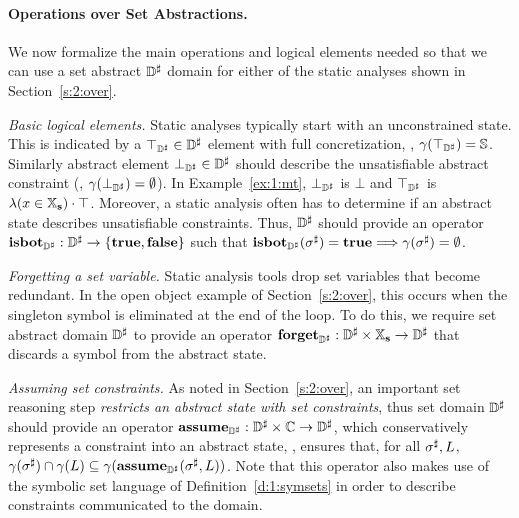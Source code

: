 \paragraph{Operations over Set Abstractions.}
We now formalize the main operations and logical elements needed so that
we can use a set abstract \( {\mathbb{D}}^{\sharp} \) domain for either of the static
analyses shown in Section~\ref{s:2:over}.
\begin{asparaitem}
\item \emph{Basic logical elements.}
  Static analyses typically start with an unconstrained state.
  This is indicated by a \( \top_{{\mathbb{D}}^{\sharp}} \in {\mathbb{D}}^{\sharp} \) element with full
  concretization, \ie, \( \gamma( \top_{{\mathbb{D}}^{\sharp}} ) = \mathbb{S} \).
  Similarly abstract element \( \bot_{{\mathbb{D}}^{\sharp}} \in {\mathbb{D}}^{\sharp} \) should describe
  the unsatisfiable abstract constraint (\ie, \( \gamma( \bot_{{\mathbb{D}}^{\sharp}} ) =
  \emptyset \)).
  In Example~\ref{ex:1:mt}, \( \bot_{{\mathbb{D}}^{\sharp}} \) is \( \bot \) and \( \top_{{\mathbb{D}}^{\sharp}} \)
  is \( \lambda (x \in \mathbb{X}_{\bf s}) \cdot \top \).
  Moreover, a static analysis often has to determine if an abstract state
  describes unsatisfiable constraints.
  Thus, \( {\mathbb{D}}^{\sharp} \) should provide an operator \( \textbf{isbot}_{{\mathbb{D}}^{\sharp}}: {\mathbb{D}}^{\sharp}
  \rightarrow \{ \mathbf{true}, \mathbf{false} \} \) such that \( \textbf{isbot}_{{\mathbb{D}}^{\sharp}}( {\sigma}^{\sharp} )
  = \mathbf{true} \Longrightarrow \gamma( {\sigma}^{\sharp} ) = \emptyset \).

\item \emph{Forgetting a set variable.}
  Static analysis tools drop set variables that become redundant.
  In the open object example of Section~\ref{s:2:over}, this occurs when
  the singleton symbol is eliminated at the end of the loop.
  To do this, we require set abstract domain \( {\mathbb{D}}^{\sharp} \) to provide
  an operator \( \textbf{forget}_{{\mathbb{D}}^{\sharp}}: {\mathbb{D}}^{\sharp} \times \mathbb{X}_{\bf s} \rightarrow {\mathbb{D}}^{\sharp} \)
  that discards a symbol from the abstract state.

\item \emph{Assuming set constraints.}
  As noted in Section~\ref{s:2:over}, an important set reasoning step
  {\em restricts an abstract state with set constraints}, thus set
  domain \( {\mathbb{D}}^{\sharp} \) should provide an operator \( \textbf{assume}_{{\mathbb{D}}^{\sharp}}: {\mathbb{D}}^{\sharp}
  \times \mathbb{C} \rightarrow {\mathbb{D}}^{\sharp} \), which conservatively represents
  a constraint into an abstract state, \ie, ensures that, for all
  \( {\sigma}^{\sharp}, L \), \( \gamma( {\sigma}^{\sharp} ) \cap \gamma( L ) \subseteq
  \gamma( \textbf{assume}_{{\mathbb{D}}^{\sharp}}( {\sigma}^{\sharp}, L ) ) \).
  Note that this operator also makes use of the symbolic set language
  of Definition~\ref{d:1:symsets} in order to describe constraints
  communicated to the domain.
  

\end{asparaitem}
